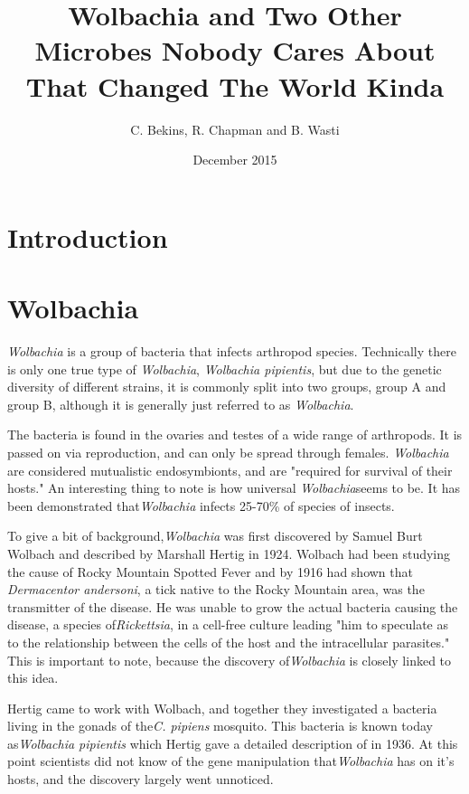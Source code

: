 \documentclass[twocolumn]{article}
\begin{document}
\title{Wolbachia and Two Other Microbes Nobody Cares About That Changed The World Kinda}
    \author{C. Bekins, R. Chapman and B. Wasti}
    \date{December 2015}
    \maketitle

\section*{Introduction}
\section*{Wolbachia}
\textit{Wolbachia} is a group of bacteria that infects arthropod species. Technically there is only one true type of \textit{Wolbachia}, \textit{Wolbachia pipientis}, but due to the genetic diversity of different strains, it is commonly split into two groups, group A and group B, although it is generally just referred to as \textit{Wolbachia}.

The bacteria is found in the ovaries and testes of a wide range of arthropods.\cite{Wbio} It is passed on via reproduction, and can only be spread through females. \textit{Wolbachia} are considered mutualistic endosymbionts, and are "required for survival of their hosts."\cite{Wdisc_nem} An interesting thing to note is how universal \textit{Wolbachia}seems to be. It has been demonstrated that\textit{Wolbachia} infects 25-70\% of species of insects.\cite{Wdisc_nem}

To give a bit of background,\textit{Wolbachia} was first discovered by Samuel Burt Wolbach and described by Marshall Hertig in 1924.\cite{Winit} Wolbach had been studying the cause of Rocky Mountain Spotted Fever and by 1916 had shown that \textit{Dermacentor andersoni}, a tick native to the Rocky Mountain area, was the transmitter of the disease.\cite{wolbachia} He was unable to grow the actual bacteria causing the disease, a species of\textit{Rickettsia}, in a cell-free culture leading "him to speculate as to the relationship between the cells of the host and the intracellular parasites."\cite{wolbachia} This is important to note, because the discovery of\textit{Wolbachia} is closely linked to this idea.

Hertig came to work with Wolbach, and together they investigated a bacteria living in the gonads of the\textit{C. pipiens} mosquito. This bacteria is known today as\textit{Wolbachia pipientis} which Hertig gave a detailed description of in 1936.\cite{Wdiscription} At this point scientists did not know of the gene manipulation that\textit{Wolbachia} has on it's hosts, and the discovery largely went unnoticed.
\end{document}
